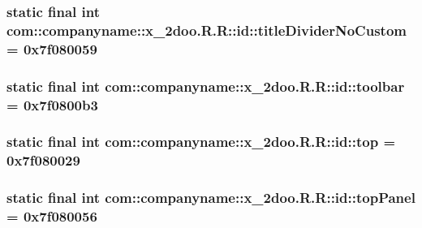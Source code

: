 \hypertarget{classcom_1_1companyname_1_1x__2doo_1_1_r_1_1id_2508688e0e93c581ccd7015ebd948329}{
\subsubsection[{titleDividerNoCustom}]{\setlength{\rightskip}{0pt plus 5cm}static final int com::companyname::x\_\-2doo.R.R::id::titleDividerNoCustom = 0x7f080059}}
\label{classcom_1_1companyname_1_1x__2doo_1_1_r_1_1id_2508688e0e93c581ccd7015ebd948329}


\hypertarget{classcom_1_1companyname_1_1x__2doo_1_1_r_1_1id_9dba723b27685493c62be30f23286a95}{
\subsubsection[{toolbar}]{\setlength{\rightskip}{0pt plus 5cm}static final int com::companyname::x\_\-2doo.R.R::id::toolbar = 0x7f0800b3}}
\label{classcom_1_1companyname_1_1x__2doo_1_1_r_1_1id_9dba723b27685493c62be30f23286a95}


\hypertarget{classcom_1_1companyname_1_1x__2doo_1_1_r_1_1id_b159ac65a73781a2796fca95bf692530}{
\subsubsection[{top}]{\setlength{\rightskip}{0pt plus 5cm}static final int com::companyname::x\_\-2doo.R.R::id::top = 0x7f080029}}
\label{classcom_1_1companyname_1_1x__2doo_1_1_r_1_1id_b159ac65a73781a2796fca95bf692530}


\hypertarget{classcom_1_1companyname_1_1x__2doo_1_1_r_1_1id_e2a325d1dc6be0749403c8e3012c1d14}{
\subsubsection[{topPanel}]{\setlength{\rightskip}{0pt plus 5cm}static final int com::companyname::x\_\-2doo.R.R::id::topPanel = 0x7f080056}}
\label{classcom_1_1companyname_1_1x__2doo_1_1_r_1_1id_e2a325d1dc6be0749403c8e3012c1d14}


